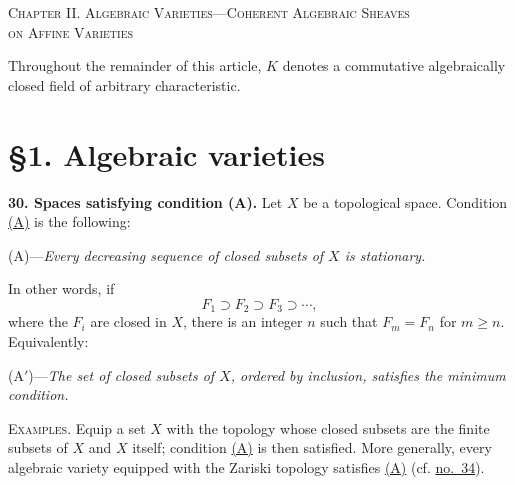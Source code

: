 
\label{fac:II}
\begin{center}
{\Large\textsc{Chapter II. Algebraic Varieties---Coherent Algebraic Sheaves}}\\
{\Large\textsc{on Affine Varieties}}
\end{center}

Throughout the remainder of this article, $K$ denotes a commutative algebraically closed field of arbitrary characteristic.

\clearpage
{}\label{fac:II:1}
\section*{\S1. Algebraic varieties}

\label{fac:II:1:no:30}
\textbf{30. Spaces satisfying condition (A).}
Let $X$ be a topological space. Condition \hyperref[fac:II:1:no:30:condition:A]{(A)} is the following:

\medskip
{}\label{fac:II:1:no:30:condition:A}
\noindent(A)---\textit{Every decreasing sequence of closed subsets of $X$ is stationary.}
\medskip

In other words, if
\[
F_1\supset F_2\supset F_3\supset\cdots,
\]
where the $F_i$ are closed in $X$, there is an integer $n$ such that $F_m=F_n$ for $m\geq n$. Equivalently:

\medskip
{}\label{fac:II:1:no:30:condition:A-prime}
\noindent(A$'$)---\textit{The set of closed subsets of $X$, ordered by inclusion, satisfies the minimum condition.}
\medskip

\textsc{Examples.}
Equip a set $X$ with the topology whose closed subsets are the finite subsets of $X$ and $X$ itself; condition \hyperref[fac:II:1:no:30:condition:A]{(A)} is then satisfied. More generally, every algebraic variety equipped with the Zariski topology satisfies \hyperref[fac:II:1:no:30:condition:A]{(A)} (cf. \hyperref[fac:II:1:no:34]{no.~34}).


